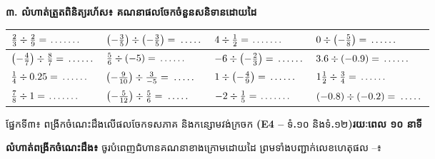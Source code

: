 \documentclass[a4paper,10pt]{article}
\newcommand{\enbf}[1]{{\TimesEn\bfseries #1}}
\newcommand{\cnum}[1]{\mbox{\fontsize{10pt}{12pt}\selectfont\ding{\numexpr181+#1\relax}}}
\newcommand{\blank}[1][1.5cm]{\makebox[#1]{\dotfill}}
\newcommand{\secbar}[2]{%
  \begin{tcolorbox}[enhanced, sharp corners, colback=headgray, colframe=black, boxrule=0.9pt, boxsep=1pt, top=2pt, bottom=2pt, left=5pt, right=5pt, before skip=4pt, after skip=3pt]
    {\muol\fontsize{9.2pt}{13pt}\selectfont #1}\hfill{\fontsize{8pt}{11pt}\selectfont\textbf{#2}}
  \end{tcolorbox}%
}
\begin{document}
\vspace{4pt}
\textbf{៣. លំហាត់ត្រួតពិនិត្យរហ័ស៖ គណនាផលចែកចំនួនសនិទានដោយដៃ}

\vspace{2.5pt}
{\renewcommand{\arraystretch}{1.62}
\begin{tabular}{|C{4.40cm}|C{4.40cm}|C{4.40cm}|C{4.40cm}|}
  \hline
  $\frac{2}{3}\div\frac{2}{9} = \blank[1.1cm]$ & $\left(-\frac{3}{5}\right)\div\left(-\frac{3}{5}\right) = \blank[0.9cm]$ & $4\div\frac{1}{2} = \blank[1.1cm]$ & $0\div\left(-\frac{5}{8}\right) = \blank[1.0cm]$ \\
  \hline
  $\left(-\frac{4}{7}\right)\div\frac{8}{7} = \blank[1.0cm]$ & $\frac{5}{6}\div(-5) = \blank[1.0cm]$ & $-6\div\left(-\frac{2}{3}\right) = \blank[1.0cm]$ & $3.6\div(-0.9) = \blank[1.0cm]$ \\
  \hline
  $\frac{1}{4}\div 0.25 = \blank[1.0cm]$ & $\left(-\frac{9}{10}\right)\div\frac{3}{-5} = \blank[0.9cm]$ & $1\div\left(-\frac{4}{9}\right) = \blank[1.0cm]$ & $1\frac{1}{2}\div\frac{3}{4} = \blank[1.0cm]$ \\
  \hline
  $\frac{7}{8}\div 1 = \blank[1.1cm]$ & $\left(-\frac{5}{12}\right)\div\frac{5}{6} = \blank[0.9cm]$ & $-2\div\frac{1}{5} = \blank[1.1cm]$ & $(-0.8)\div(-0.2) = \blank[0.9cm]$ \\
  \hline
\end{tabular}}

\newpage

\secbar{ផ្នែកទី៣៖ ពង្រីកចំណេះដឹងលើផលចែកទសភាគ និងកន្សោមវង់ក្រចក \enbf{(E4 --} ទំ\enbf{.}១០ និងទំ\enbf{.}១២\enbf{)}}{រយៈពេល ១០ នាទី}

\textbf{លំហាត់ពង្រីកចំណេះដឹង៖} ចូរបំពេញជំហានគណនាខាងក្រោមដោយដៃ ព្រមទាំងបញ្ជាក់លេខហេតុផល \cnum{1}--\cnum{5}៖
\end{document}

